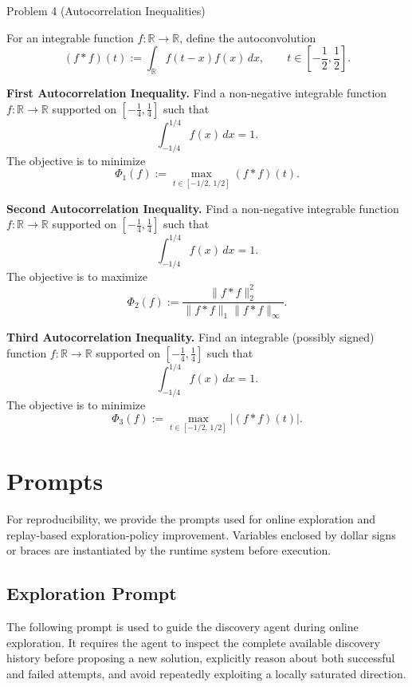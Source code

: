 \begin{taskbox}{Problem 4 (Autocorrelation Inequalities)}
\small

For an integrable function $f:\mathbb{R}\to\mathbb{R}$, define the
autoconvolution
\[
(f*f)(t)
:=
\int_{\mathbb{R}} f(t-x)f(x)\,dx,
\qquad
t\in\left[-\frac12,\frac12\right].
\]

\textbf{First Autocorrelation Inequality.}
Find a non-negative integrable function
$f:\mathbb{R}\to\mathbb{R}$
supported on
$\left[-\frac14,\frac14\right]$
such that
\[
\int_{-1/4}^{1/4} f(x)\,dx = 1.
\]
The objective is to minimize
\[
\Phi_1(f)
:=
\max_{t\in[-1/2,\,1/2]} (f*f)(t).
\]

\textbf{Second Autocorrelation Inequality.}
Find a non-negative integrable function
$f:\mathbb{R}\to\mathbb{R}$
supported on
$\left[-\frac14,\frac14\right]$
such that
\[
\int_{-1/4}^{1/4} f(x)\,dx = 1.
\]
The objective is to maximize
\[
\Phi_2(f)
:=
\frac{\|f*f\|_2^2}
{\|f*f\|_1\|f*f\|_\infty}.
\]

\textbf{Third Autocorrelation Inequality.}
Find an integrable (possibly signed) function
$f:\mathbb{R}\to\mathbb{R}$
supported on
$\left[-\frac14,\frac14\right]$
such that
\[
\int_{-1/4}^{1/4} f(x)\,dx = 1.
\]
The objective is to minimize
\[
\Phi_3(f)
:=
\max_{t\in[-1/2,\,1/2]}
\left|(f*f)(t)\right|.
\]

\end{taskbox}



\section{Prompts}
\label{app:prompts}

For reproducibility, we provide the prompts used for online exploration and
replay-based exploration-policy improvement.
Variables enclosed by dollar signs or braces are instantiated by the runtime
system before execution.

\subsection{Exploration Prompt}
\label{app:exploration-prompt}

The following prompt is used to guide the discovery agent during online
exploration. It requires the agent to inspect the complete available discovery
history before proposing a new solution, explicitly reason about both successful
and failed attempts, and avoid repeatedly exploiting a locally saturated
direction.


